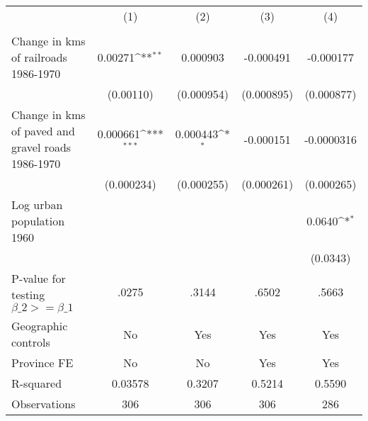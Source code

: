 {
\def\sym#1{\ifmmode^{#1}\else\(^{#1}\)\fi}
\begin{tabular}{l*{4}{c}}
\hline\hline
                &\multicolumn{1}{c}{(1)}&\multicolumn{1}{c}{(2)}&\multicolumn{1}{c}{(3)}&\multicolumn{1}{c}{(4)}\\
                &\multicolumn{1}{c}{}&\multicolumn{1}{c}{}&\multicolumn{1}{c}{}&\multicolumn{1}{c}{}\\
\hline
Change in kms of railroads 1986-1970&  0.00271\sym{**} & 0.000903         &-0.000491         &-0.000177         \\
                &(0.00110)         &(0.000954)         &(0.000895)         &(0.000877)         \\
[1em]
Change in kms of paved and gravel roads 1986-1970& 0.000661\sym{***}& 0.000443\sym{*}  &-0.000151         &-0.0000316         \\
                &(0.000234)         &(0.000255)         &(0.000261)         &(0.000265)         \\
[1em]
Log urban population 1960&                  &                  &                  &   0.0640\sym{*}  \\
                &                  &                  &                  & (0.0343)         \\
\hline
P-value for testing $\beta\_{2} >= \beta\_{1}$&    .0275         &    .3144         &    .6502         &    .5663         \\
Geographic controls&       No         &      Yes         &      Yes         &      Yes         \\
Province FE     &       No         &       No         &      Yes         &      Yes         \\
R-squared       &  0.03578         &   0.3207         &   0.5214         &   0.5590         \\
Observations    &      306         &      306         &      306         &      286         \\
\hline\hline
\end{tabular}
}

